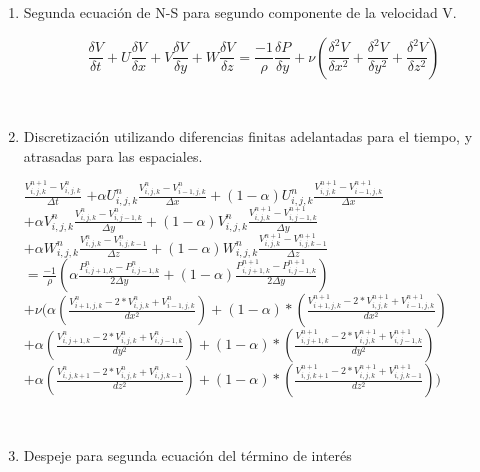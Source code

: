 \documentclass[a4paper]{article}
\begin{document}
\begin{enumerate}

\item Segunda ecuación de N-S para segundo componente de la velocidad V.

$$ \frac{\delta V}{\delta t} + U \frac{\delta V}{\delta x} + V \frac{\delta V}{\delta y} + W \frac{\delta V}{\delta z} =  \frac{-1}{\rho} \frac{\delta P}{\delta y} + \nu (\frac{{\delta}^{2} V}{\delta {x}^{2}} + \frac{{\delta}^{2} V}{\delta {y}^{2}} + \frac{{\delta}^{2} V}{\delta {z}^{2}}) $$

~\\

\item Discretización utilizando diferencias finitas adelantadas para el tiempo, y atrasadas para las espaciales.

$ \frac{ {V}^{n+1}_{i,j,k} - V^{n}_{i,j,k}}{ \Delta t} $
$+ \alpha {U}^{n}_{i,j,k} \frac{ {V}^{n}_{i,j,k} - V^{n}_{i-1,j,k}}{\Delta x} + (1 - \alpha) {U}^{n}_{i,j,k} \frac{ {V}^{n+1}_{i,j,k} - V^{n+1}_{i-1,j,k}}{ \Delta x}$ 
\\
$+ \alpha {V}^{n}_{i,j,k} \frac{ {V}^{n}_{i,j,k} - V^{n}_{i,j-1,k}}{ \Delta y} + (1 - \alpha) {V}^{n}_{i,j,k} \frac{ {V}^{n+1}_{i,j,k} - V^{n+1}_{i,j-1,k}}{ \Delta y}$
\\
$+ \alpha {W}^{n}_{i,j,k} \frac{ {V}^{n}_{i,j,k} - V^{n}_{i,j,k-1}}{ \Delta z} + (1 - \alpha) {W}^{n}_{i,j,k} \frac{ {V}^{n+1}_{i,j,k} - V^{n+1}_{i,j,k-1}}{ \Delta z}$
\\
$= \frac{-1}{\rho} ( \alpha \frac{P^{n}_{i,j+1,k} - P^{n}_{i,j-1,k} }{ 2 \Delta y } + (1 - \alpha) \frac{P^{n+1}_{i,j+1,k} - P^{n+1}_{i,j-1,k} }{ 2 \Delta y })  $
\\
$+ \nu (\alpha (\frac{ V^{n}_{i+1,j,k} - 2*V^{n}_{i,j,k} + V^{n}_{i-1,j,k}}{dx^2}) + (1-\alpha)*(\frac{ V^{n+1}_{i+1,j,k} - 2*V^{n+1}_{i,j,k} + V^{n+1}_{i-1,j,k}}{dx^2})$
\\
$+ \alpha (\frac{ V^{n}_{i,j+1,k} - 2*V^{n}_{i,j,k} + V^{n}_{i,j-1,k}}{dy^2}) + (1-\alpha)*(\frac{ V^{n+1}_{i,j+1,k} - 2*V^{n+1}_{i,j,k} + V^{n+1}_{i,j-1,k}}{dy^2})$
\\
$+ \alpha (\frac{ V^{n}_{i,j,k+1} - 2*V^{n}_{i,j,k} + V^{n}_{i,j,k-1}}{dz^2}) + (1-\alpha)*(\frac{ V^{n+1}_{i,j,k+1} - 2*V^{n+1}_{i,j,k} + V^{n+1}_{i,j,k-1}}{dz^2}))$

~\\

\item Despeje para segunda ecuación del término de interés


\end{enumerate}
\end{document}
